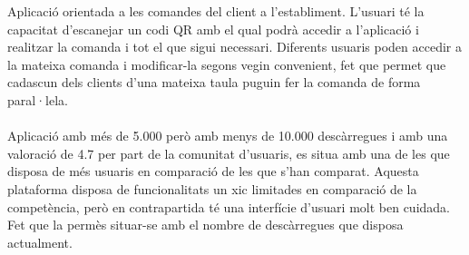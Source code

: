 Aplicació\cite{fastorder} orientada a les comandes del client a l'establiment. L'usuari té la capacitat d'escanejar un codi QR amb el qual podrà accedir a l'aplicació i realitzar la comanda i tot el que sigui necessari. Diferents usuaris poden accedir a la mateixa comanda i modificar-la segons vegin convenient, fet que permet que cadascun dels clients d'una mateixa taula puguin fer la comanda de forma paral·lela.
\\\\
Aplicació amb més de 5.000 però amb menys de 10.000 descàrregues i amb una valoració de 4.7 per part de la comunitat d'usuaris, es situa amb una de les que disposa de més usuaris en comparació de les que s'han comparat. Aquesta plataforma disposa de funcionalitats un xic limitades en comparació de la competència, però en contrapartida té una interfície d'usuari molt ben cuidada. Fet que la permès situar-se amb el nombre de descàrregues que disposa actualment.
\\
